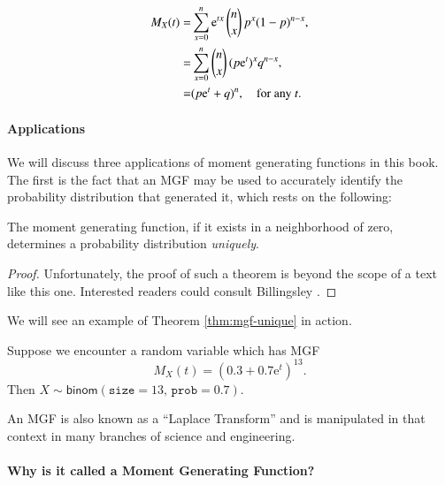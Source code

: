 \documentclass[captions=tableheading]{scrbook}
\begin{document}
\begin{alignat*}{1}
M_{X}(t)= & \sum_{x=0}^{n}\mathrm{e}^{tx}\,{n \choose x}\, p^{x}(1-p)^{n-x},\\
= & \sum_{x=0}^{n}{n \choose x}\,(p\mathrm{e}^{t})^{x}q^{n-x},\\
= & (p\mathrm{e}^{t}+q)^{n},\quad\mbox{for any \ensuremath{t}.}
\end{alignat*}


\paragraph*{Applications}

We will discuss three applications of moment generating functions in this book. The first is the fact that an MGF may be used to accurately identify the probability distribution that generated it, which rests on the following:

\begin{thm}
\label{thm:mgf-unique}
The moment generating function, if it exists in a neighborhood of zero, determines a probability distribution \emph{uniquely}. 
\end{thm}

\begin{proof}
Unfortunately, the proof of such a theorem is beyond the scope of a text like this one. Interested readers could consult Billingsley \cite{Billingsley1995}.
\end{proof}


We will see an example of Theorem \ref{thm:mgf-unique} in action.

\begin{example}
Suppose we encounter a random variable which has MGF
\[
M_{X}(t)=(0.3+0.7\mathrm{e}^{t})^{13}.
\]
Then \(X\sim\mathsf{binom}(\mathtt{size}=13,\,\mathtt{prob}=0.7)\).
\end{example}

An MGF is also known as a ``Laplace Transform'' and is manipulated in that context in many branches of science and engineering.

\paragraph*{Why is it called a Moment Generating Function?}
\end{document}

